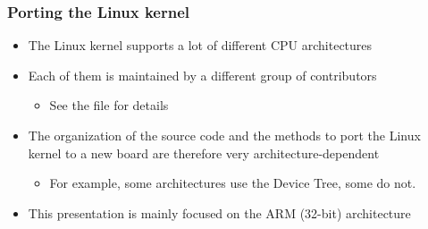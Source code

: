 \begin{frame}
  \frametitle{Porting the Linux kernel}
  \begin{itemize}
  \item The Linux kernel supports a lot of different CPU architectures
  \item Each of them is maintained by a different group of
    contributors
    \begin{itemize}
    \item See the  file for details
    \end{itemize}
  \item The organization of the source code and the methods to port
    the Linux kernel to a new board are therefore very
    architecture-dependent
    \begin{itemize}
    \item For example, some architectures use the Device Tree, some do
      not.
    \end{itemize}
  \item This presentation is mainly focused on the ARM (32-bit) architecture
  \end{itemize}
\end{frame}

